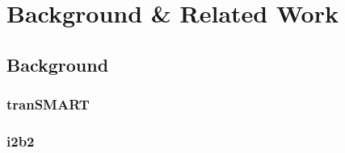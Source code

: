 \chapter{Background \& Related Work}

\section{Background}

\subsection{tranSMART}

\subsection{i2b2}









